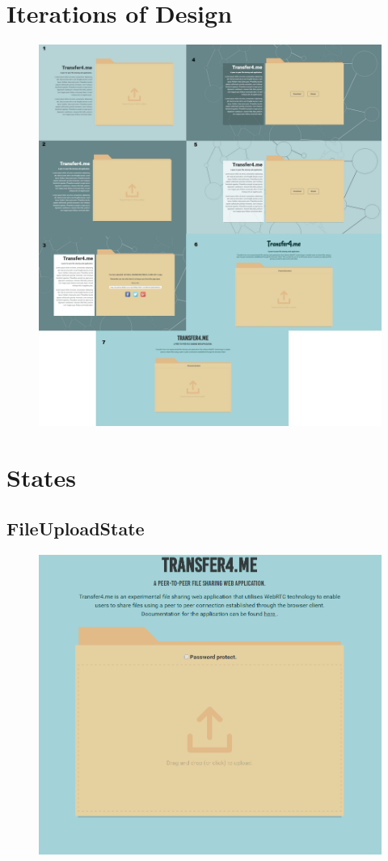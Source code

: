 \documentclass[]{report}
\begin{document}
	\chapter{Iterations of Design}
		\begin{figure}[H]
			\centering
			\includegraphics[scale=0.15]{design.png}
		\end{figure}
	\chapter{States}
	\section{FileUploadState}
		\begin{figure}[H]
			\centering
			\includegraphics[scale=0.6]{fileuploadstate.png}
		\end{figure}	
\end{document}
